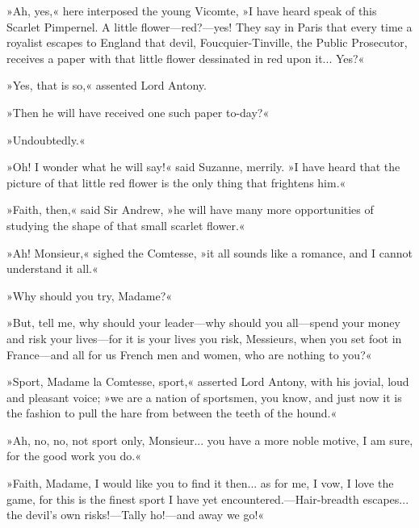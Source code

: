 »Ah, yes,« here interposed the young Vicomte, »I have heard speak of this Scarlet Pimpernel. A little flower\allowbreak---\allowbreak red?\allowbreak---\allowbreak yes! They say in Paris that every time a royalist escapes to England that devil, Foucquier-Tinville, the Public Prosecutor, receives a paper with that little flower dessinated in red upon it... Yes?«

»Yes, that is so,« assented Lord Antony.

»Then he will have received one such paper to-day?«

»Undoubtedly.«

»Oh! I wonder what he will say!« said Suzanne, merrily. »I have heard that the picture of that little red flower is the only thing that frightens him.«

»Faith, then,« said Sir Andrew, »he will have many more opportunities of studying the shape of that small scarlet flower.«

»Ah! Monsieur,« sighed the Comtesse, »it all sounds like a romance, and I cannot understand it all.«

»Why should you try, Madame?«

»But, tell me, why should your leader\allowbreak---\allowbreak why should you all\allowbreak---\allowbreak spend your money and risk your lives\allowbreak---\allowbreak for it is your lives you risk, Messieurs, when you set foot in France\allowbreak---\allowbreak and all for us French men and women, who are nothing to you?«

»Sport, Madame la Comtesse, sport,« asserted Lord Antony, with his jovial, loud and pleasant voice; »we are a nation of sportsmen, you know, and just now it is the fashion to pull the hare from between the teeth of the hound.«

»Ah, no, no, not sport only, Monsieur... you have a more noble motive, I am sure, for the good work you do.«

»Faith, Madame, I would like you to find it then... as for me, I vow, I love the game, for this is the finest sport I have yet encountered.\allowbreak---\allowbreak Hair-breadth escapes... the devil's own risks!\allowbreak---\allowbreak Tally ho!\allowbreak---\allowbreak and away we go!«

